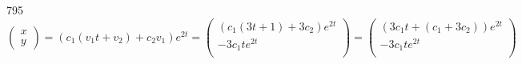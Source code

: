 \documentclass[12pt,a4paper]{article}
\begin{document}
\begin{problem}{795}
        \[
            \begin{pmatrix}
                x\\y
            \end{pmatrix}
            = (c_1 (v_1 t + v_2) + c_2 v_1) e^{2t}
            =
            \begin{pmatrix}
                (c_1(3t + 1) + 3c_2) e^{2t}\\
                -3c_1t e^{2t}\\
            \end{pmatrix}
            =
            \begin{pmatrix}
                (3c_1t + (c_1 + 3c_2)) e^{2t}\\
                -3c_1t e^{2t}\\
            \end{pmatrix}
        \]
    \end{problem}
\end{document}
